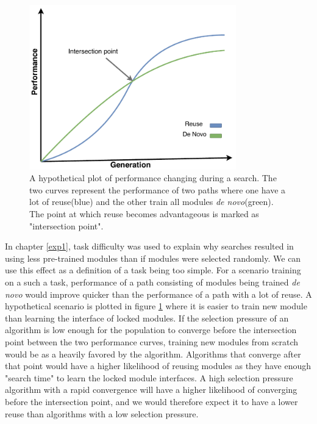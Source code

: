 \begin{figure}[ht]
    \centering
    \includegraphics[width=0.8\textwidth]{Chapters/4.Experiments/exp2/figures/reuse_vs_new.pdf}
    \caption[Hypothetical performance plot]{A hypothetical plot of performance changing during a search. The two curves represent the performance of two paths where one have a lot of reuse(blue) and the other train all modules \textit{de novo}(green). The point at which reuse becomes advantageous is marked as "intersection point".}
    \label{fig:reuse_vs_new}
\end{figure}

In chapter \ref{exp1}, task difficulty was used to explain why searches resulted in using less pre-trained modules than if modules were selected randomly. We can use this effect as a definition of a task being too simple. For a scenario training on a such a task, performance of a path consisting of modules being trained \textit{de novo} would improve quicker than the performance of a path with a lot of reuse. A hypothetical scenario is plotted in figure \ref{fig:reuse_vs_new} where it is easier to train new module than learning the interface of locked modules. If the selection pressure of an algorithm is low enough for the population to converge before the intersection point between the two performance curves, training new modules from scratch would be as a heavily favored by the algorithm.  Algorithms that converge after that point would have a higher likelihood of reusing modules as they have enough "search time" to learn the locked module interfaces. A high selection pressure algorithm with a rapid convergence will have a higher likelihood of converging before the intersection point, and we would therefore expect it to have a lower reuse than algorithms with a low selection pressure. 

